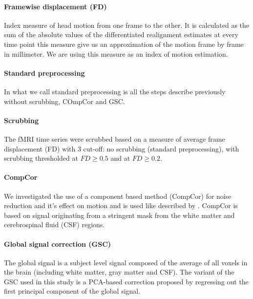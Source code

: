 \documentclass[authoryear]{elsarticle}
\begin{document}
\paragraph{Framewise displacement (FD)}
Index measure of head motion from one frame to the other. It is calculated as the sum of the absolute values of the differentiated realignment estimates at every time point \citep{Power2012} this measure give us an approximation of the motion frame by frame in millimeter. We are using this measure as an index of motion estimation.

\paragraph{Standard preprocessing}
In what we call standard preprocessing is all the steps describe previously without scrubbing, COmpCor and GSC.

\paragraph{Scrubbing}
The fMRI time series were scrubbed based on a measure of average frame displacement (FD) with 3 cut-off: no scrubbing (standard preprocessing), with scrubbing thresholded at $FD\geq0.5$ and at $FD\geq0.2$.

\paragraph{CompCor}
We investigated the use of a component based method (CompCor) for noise reduction and it's effect on motion and is used like described by \cite{Behzadi2007}. CompCor is based on signal originating from a stringent mask from the white matter and cerebrospinal fluid (CSF) regions.

\paragraph{Global signal correction (GSC)}
The global signal is a subject level signal composed of the average of all voxels in the brain (including white matter, gray matter and CSF). The variant of the GSC used in this study is a PCA-based correction proposed by \cite{Carbonell2012} regressing out the first principal component of the global signal.

\end{document}
